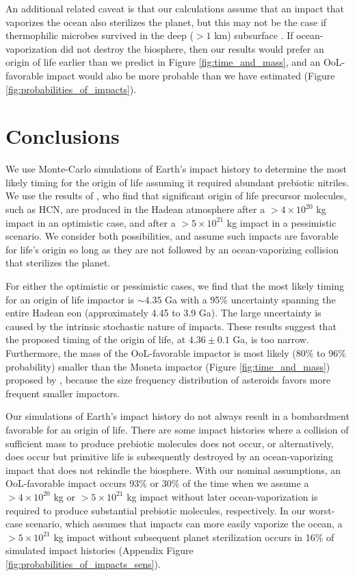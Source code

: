 \documentclass{Liebert_Author}
\begin{document}
An additional related caveat is that our calculations assume that an impact that vaporizes the ocean also sterilizes the planet, but this may not be the case if thermophilic microbes survived in the deep ($> 1$ km) subsurface \citep{Sleep_1998,Zahnle_2006}. If ocean-vaporization did not destroy the biosphere, then our results would prefer an origin of life earlier than we predict in Figure \ref{fig:time_and_mass}, and an OoL-favorable impact would also be more probable than we have estimated (Figure \ref{fig:probabilities_of_impacts}).

\section{Conclusions}

We use Monte-Carlo simulations of Earth's impact history to determine the most likely timing for the origin of life assuming it required abundant prebiotic nitriles. We use the results of \citet{Wogan_2023}, who find that significant origin of life precursor molecules, such as HCN, are produced in the Hadean atmosphere after a $> 4 \times 10^{20}$ kg impact in an optimistic case, and after a $> 5 \times 10^{21}$ kg impact in a pessimistic scenario. We consider both possibilities, and assume such impacts are favorable for life's origin so long as they are not followed by an ocean-vaporizing collision that sterilizes the planet.

For either the optimistic or pessimistic cases, we find that the most likely timing for an origin of life impactor is $\sim 4.35$ Ga with a 95\% uncertainty spanning the entire Hadean eon (approximately 4.45 to 3.9 Ga). The large uncertainty is caused by the intrinsic stochastic nature of impacts. These results suggest that the \citet{Benner_2020} proposed timing of the origin of life, at $4.36 \pm 0.1$ Ga, is too narrow. Furthermore, the mass of the OoL-favorable impactor is most likely (80\% to 96\% probability) smaller than the Moneta impactor (Figure \ref{fig:time_and_mass}) proposed by \citet{Benner_2020}, because the size frequency distribution of asteroids favors more frequent smaller impactors.

Our simulations of Earth's impact history do not always result in a bombardment favorable for an origin of life. There are some impact histories where a collision of sufficient mass to produce prebiotic molecules does not occur, or alternatively, does occur but primitive life is subsequently destroyed by an ocean-vaporizing impact that does not rekindle the biosphere. With our nominal assumptions, an OoL-favorable impact occurs 93\% or 30\% of the time when we assume a $> 4 \times 10^{20}$ kg or $> 5 \times 10^{21}$ kg impact without later ocean-vaporization is required to produce substantial prebiotic molecules, respectively. In our worst-case scenario, which assumes that impacts can more easily vaporize the ocean, a $> 5 \times 10^{21}$ kg impact without subsequent planet sterilization occurs in 16\% of simulated impact histories (Appendix Figure \ref{fig:probabilities_of_impacts_sens}).
\end{document}
